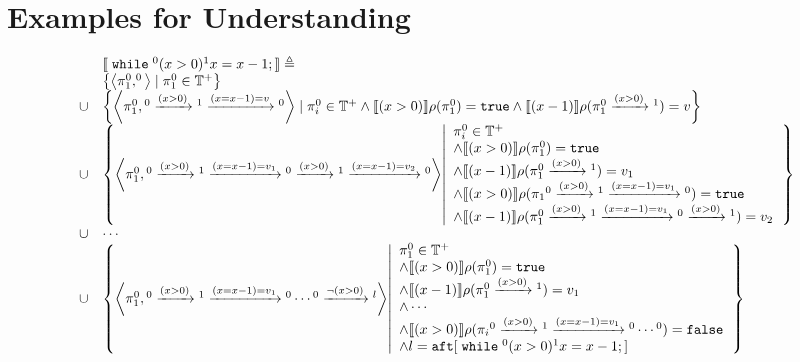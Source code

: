 \section{Examples for Understanding \cite{cousot2019abstract}}
\begin{example}
 \[
 \begin{array}{ll}
 & \sem{
 \ewhile {}^0 (x > 0) {}^1 x = x - 1;
 } \triangleq \\
 & \left\{ \left< \pi_1^0, ^0\right> \mid \pi_1^0 \in \mathbb{T^{+}} \right\}
 \\
 \cup & \left\{ \left< \pi_1^0, {}^0 \xrightarrow{(x > 0)} {}^1 \xrightarrow{(x = x - 1) = v} {}^0 \right> 
 \mid \pi_i^0 \in \mathbb{T^{+}} \land 
 \sem{(x > 0)}\env(\pi_1^0) = \etrue  \land
 \sem{(x - 1)}\env(\pi_1^0 \xrightarrow{(x > 0)} {}^1) = v \right\}
 \\
 \cup & \left\{ \left< \pi_1^0, {}^0 \xrightarrow{(x > 0)} {}^1 \xrightarrow{(x = x - 1) = v_1} {}^0 \xrightarrow{(x > 0)} {}^1 \xrightarrow{(x = x - 1) = v_2} {}^0 \right> 
 \left \vert 
 \begin{array}{l}
 \pi_i^0 \in \mathbb{T^{+}} \\
 \land 
 \sem{(x > 0)}\env(\pi_1^0) = \etrue  \\
 \land
 \sem{(x - 1)}\env(\pi_1^0 \xrightarrow{(x > 0)} {}^1) = v_1 \\
 \land 
 \sem{(x > 0)}\env(\pi_1{}^0 \xrightarrow{(x > 0)} {}^1 \xrightarrow{(x = x - 1) = v_1} {}^0) = \etrue \\
 \land
 \sem{(x - 1)}\env(\pi_1^0 \xrightarrow{(x > 0)} {}^1 \xrightarrow{(x = x - 1) = v_1} {}^0 \xrightarrow{(x > 0)} {}^1) = v_2
 \end{array}
 \right.
 \right\}
 \\
 \cup & \cdots 
 \\
 \cup & \left\{ \left< \pi_1^0, {}^0 \xrightarrow{(x > 0)} {}^1\xrightarrow{(x = x - 1) = v_1} {}^0 \cdots  {}^0 \xrightarrow{\neg(x > 0)} {}^l \right>  
 \left \vert 
 \begin{array}{l}
 \pi_1^0 \in \mathbb{T^{+}}\\
 \land 
 \sem{(x > 0)}\env(\pi_1^0) = \etrue  \\
 \land
 \sem{(x - 1)}\env(\pi_1^0 \xrightarrow{(x > 0)} {}^1) = v_1 \\
 \land \cdots \\
 \land 
 \sem{(x > 0)}\env(\pi_i{}^0 \xrightarrow{(x > 0)} {}^1\xrightarrow{(x = x - 1) = v_1} {}^0 \cdots  {}^0) = \efalse \\
 \land l = \kw{aft}[\ewhile {}^0 (x > 0) {}^1 x = x - 1;]
 \end{array}
 \right.
 \right\}
 \end{array}
 \]
 \end{example}
